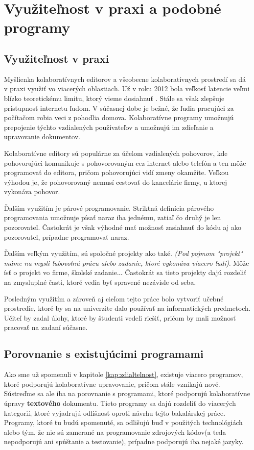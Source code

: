 \chapter{Využiteľnost v praxi a podobné programy}

\label{kap:usability_and_similar} %

\section{Využiteľnost v praxi}
Myšlienka kolaboratívnych editorov a všeobecne kolaboratívnych prostredí sa dá v praxi využiť vo 
viacerých oblastiach. Už v roku 2012 bola veľkosť latencie veľmi blízko teoretickému limitu,
ktorý vieme dosiahnuť \cite{latency_bottleneck}. Stále sa však zlepšuje prístupnosť internetu
ľuďom. V súčasnej dobe je bežné, že ľudia pracujúci za počítačom robia veci z pohodlia domova.
Kolaboratívne programy umožnujú prepojenie týchto vzdialených používateľov a umožnujú im zdieľanie
a upravovanie dokumentov.

Kolaboratívne editory sú populárne za účelom vzdialených pohovorov, kde pohovorujúci komunikuje s
pohovorovaným cez internet alebo telefón a ten môže programovať do editora, pričom pohovorujúci 
vidí zmeny okamžite. Veľkou výhodou je, že pohovorovaný nemusí cestovať do kancelárie firmy, u
ktorej vykonáva pohovor.

Ďalším využitím je párové programovanie. Striktná definícia párového programovania umožnuje
písať naraz iba jednému, zatiaľ čo druhý je len pozorovateľ. Častokrát je však výhodné mať možnosť
zasiahnuť do kódu aj ako pozorovateľ, prípadne programovať naraz.

Ďalším veľkým využitím, sú spoločné projekty ako také. \textit{(Pod pojmom "projekt" máme na mysli
ľubovolnú prácu alebo zadanie, ktoré vykonáva viacero ľudí)}. Môže ísť o projekt vo firme, školské
zadanie... Častokrát sa tieto projekty dajú rozdeliť na zmysluplné časti, ktoré vedia byť spravené 
nezávisle od seba.

Posledným využitím a zároveň aj cieľom tejto práce bolo vytvoriť učebné prostredie, ktoré by sa na
univerzite dalo používať na informatických predmetoch. Učiteľ by zadal úlohy, ktoré by študenti
vedeli riešiť, pričom by mali možnosť pracovať na zadaní súčasne.

\section{Porovnanie s existujúcimi programami}
Ako sme už spomenuli v kapitole \ref{kap:zdialtelnost}, existuje viacero programov, ktoré podporujú
kolaboratívne upravovanie, pričom stále vznikajú nové. Sústreďme sa ale iba na porovnanie s
programami, ktoré podporujú kolaboratívne úpravy \textbf{textového} dokumentu. Tieto programy sa
dajú rozdeliť do viacerých kategorií, ktoré vyjadrujú odlišnosť oproti návrhu tejto bakalárskej
práce. Programy, ktoré tu budú spomenuté, sa odlišujú buď v použitých technológiách alebo tým, že nie
sú zamerané na programovanie zdrojových kódov(a teda nepodporujú ani spúštanie a testovanie),
prípadne podporujú iba nejaké jazyky.

